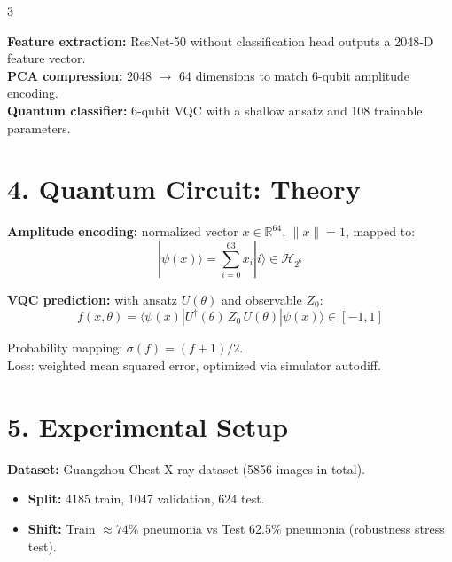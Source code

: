 \documentclass[a0,portrait]{a0poster}
\begin{document}
\begin{multicols}{3}
\vspace{0.2cm}

\noindent
\textbf{Feature extraction:} ResNet-50 without classification head outputs a 2048-D feature vector.\\
\textbf{PCA compression:} 2048 \(\rightarrow\) 64 dimensions to match 6-qubit amplitude encoding.\\
\textbf{Quantum classifier:} 6-qubit VQC with a shallow ansatz and 108 trainable parameters.


\color{UWBBlue}\section*{4. Quantum Circuit: Theory}
\color{TechGrey}

\noindent
\textbf{Amplitude encoding:} normalized vector \(x \in \mathbb{R}^{64}\), \(\|x\|=1\), mapped to:
\begin{equation}
|\psi(x)\rangle = \sum_{i=0}^{63} x_i |i\rangle \in \mathcal{H}_{2^6}
\end{equation}

\noindent
\textbf{VQC prediction:} with ansatz \(U(\theta)\) and observable \(Z_0\):
\begin{equation}
f(x,\theta) = \langle \psi(x) | U^\dagger(\theta)\, Z_0\, U(\theta) | \psi(x) \rangle \in [-1,1]
\end{equation}

\noindent
Probability mapping: \(\sigma(f)=(f+1)/2\).\\
Loss: weighted mean squared error, optimized via simulator autodiff.


\color{UWBBlue}\section*{5. Experimental Setup}
\color{TechGrey}

\noindent
\textbf{Dataset:} Guangzhou Chest X-ray dataset (5856 images in total).
\begin{itemize}[leftmargin=0.9em,itemsep=0.1em,topsep=0.1em]
\item \textbf{Split:} 4185 train, 1047 validation, 624 test.
\item \textbf{Shift:} Train \(\approx 74\%\) pneumonia vs Test 62.5\% pneumonia (robustness stress test).
\end{itemize}


\end{multicols}
\end{document}
